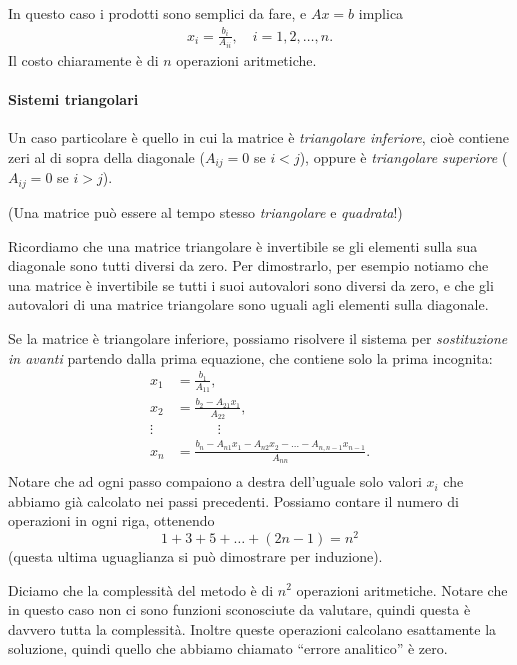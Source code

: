 \documentclass[a4paper]{report}
\theoremstyle{definiton}
\theoremstyle{remark}
\begin{document}
In questo caso i prodotti sono semplici da fare, e $Ax=b$ implica
\begin{align*}
x_i = \frac{b_i}{A_{ii}}, \quad i=1,2,\dots,n.
\end{align*}
Il costo chiaramente è di $n$ operazioni aritmetiche.

\paragraph{Sistemi triangolari}

Un caso particolare  è quello in cui la matrice è \emph{triangolare inferiore}, cioè contiene zeri al di sopra della diagonale ($A_{ij} =0$ se $i<j$), oppure è \emph{triangolare superiore} ($A_{ij}=0$ se $i>j$).

(Una matrice può essere al tempo stesso \emph{triangolare} e \emph{quadrata}!)

Ricordiamo che una matrice triangolare è invertibile se gli elementi sulla sua diagonale sono tutti diversi da zero. Per dimostrarlo, per esempio notiamo che una matrice è invertibile se tutti i suoi autovalori sono diversi da zero, e che gli autovalori di una matrice triangolare sono uguali agli elementi sulla diagonale.

Se la matrice è triangolare inferiore, possiamo risolvere il sistema per \emph{sostituzione in avanti} partendo dalla prima equazione, che contiene solo la prima incognita:
\begin{align*}
 x_1 &= \frac{b_1}{A_{11}},\\
 x_2 &= \frac{b_2 - A_{21}x_1}{A_{22}},\\
 \vdots & \quad \quad \quad \vdots\\
 x_n &= \frac{b_n - A_{n1}x_1 - A_{n2}x_2 - \dots -A_{n,n-1}x_{n-1}}{A_{nn}}.\\
 \end{align*} 
Notare che ad ogni passo compaiono a destra dell'uguale solo valori $x_i$ che abbiamo già calcolato nei passi precedenti.
Possiamo contare il numero di operazioni in ogni riga, ottenendo
\[
1 + 3 + 5 + \dots + (2n-1) = n^2
\]
(questa ultima uguaglianza si può dimostrare per induzione).

Diciamo che la complessità del metodo è di $n^2$ operazioni aritmetiche. Notare che in questo caso non ci sono funzioni sconosciute da valutare, quindi questa è davvero tutta la complessità. Inoltre queste operazioni calcolano esattamente la soluzione, quindi quello che abbiamo chiamato ``errore analitico'' è zero.
\end{document}

